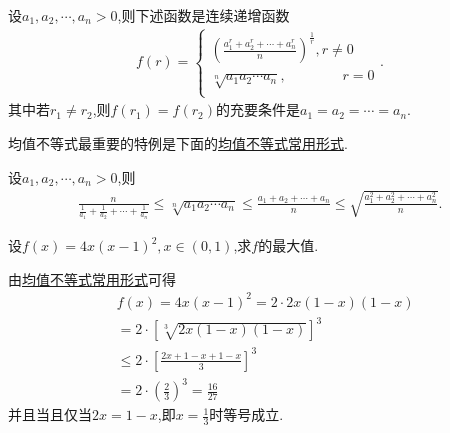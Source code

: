 \documentclass[../../main.tex]{subfiles}%
\begin{document}
\begin{theorem}[均值不等式]\label{theorem:均值不等式}
设$a_1,a_2,\cdots,a_n>0$,则下述函数是连续递增函数
\begin{align}
f\left( r \right) =\begin{cases}
\left( \frac{a_{1}^{r}+a_{2}^{r}+\cdots +a_{n}^{r}}{n} \right) ^{\frac{1}{r}},r\ne 0\\
\sqrt[n]{a_1a_2\cdots a_n},\,\,\,\,\,\,\,\,\,\,\,\,\,\,\,\,\,\,\,\,\,\,\,\,r=0\\
\end{cases}.
\end{align}
其中若$r_1\ne r_2$,则$f(r_1)=f(r_2)$的充要条件是$a_1=a_2=\cdots=a_n$.
\end{theorem}
\begin{note}
均值不等式最重要的特例是下面的\hyperref[theorem:均值不等式常用形式]{均值不等式常用形式}.
\end{note}
\begin{theorem}[均值不等式常用形式]\label{theorem:均值不等式常用形式}
设$a_1,a_2,\cdots,a_n>0$,则
\begin{align*}
\frac{n}{\frac{1}{a_1}+\frac{1}{a_2}+\cdots +\frac{1}{a_n}}\leqslant \sqrt[n]{a_1a_2\cdots a_n}\leqslant \frac{a_1+a_2+\cdots +a_n}{n}\leqslant \sqrt{\frac{a_{1}^{2}+a_{2}^{2}+\cdots +a_{n}^{2}}{n}}.
\end{align*}
\end{theorem}

\begin{example}
设$f(x)=4x(x-1)^2,x\in(0,1)$,求$f$的最大值.
\end{example}
\begin{solution}
由\hyperref[theorem:均值不等式常用形式]{均值不等式常用形式}可得
\begin{align*}
&f\left( x \right) =4x\left( x-1 \right) ^2=2\cdot 2x\left( 1-x \right) \left( 1-x \right) 
\\
&= 2\cdot \left[ \sqrt[3]{2x\left( 1-x \right) \left( 1-x \right)} \right] ^3
\\
&\leqslant 2\cdot \left[ \frac{2x+1-x+1-x}{3} \right] ^3
\\
&=2\cdot \left( \frac{2}{3} \right) ^3=\frac{16}{27}
\end{align*}
并且当且仅当$2x=1-x$,即$x=\frac{1}{3}$时等号成立.

\end{solution}
\end{document}

